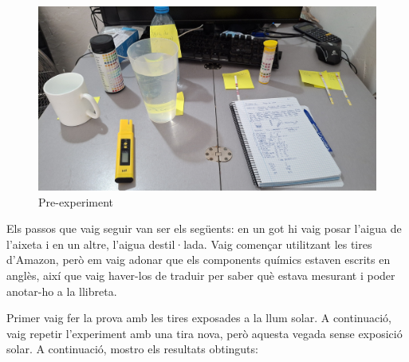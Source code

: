 \begin{figure}[H]
\centering
\includegraphics[width=1\textwidth, angle=0]{./Figures/expe.png}
\caption{Pre-experiment }
\label{fig:foto}
\end{figure}

Els passos que vaig seguir van ser els següents: en un got hi vaig posar l’aigua de l’aixeta i en un altre, l’aigua destil·lada. Vaig començar utilitzant les tires d’Amazon, però em vaig adonar que els components químics estaven escrits en anglès, així que vaig haver-los de traduir per saber què estava mesurant i poder anotar-ho a la llibreta.

Primer vaig fer la prova amb les tires exposades a la llum solar. A continuació, vaig repetir l’experiment amb una tira nova, però aquesta vegada sense exposició solar. A continuació, mostro els resultats obtinguts:


